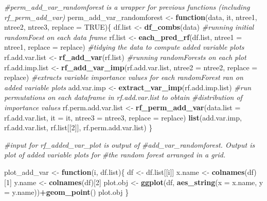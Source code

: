 \documentclass[12pt,twoside]{reedthesis}
\newenvironment{Shaded}{\begin{snugshade}}{\end{snugshade}}
\newcommand{\KeywordTok}[1]{\textcolor[rgb]{0.13,0.29,0.53}{\textbf{#1}}}
\newcommand{\DataTypeTok}[1]{\textcolor[rgb]{0.13,0.29,0.53}{#1}}
\newcommand{\DecValTok}[1]{\textcolor[rgb]{0.00,0.00,0.81}{#1}}
\newcommand{\StringTok}[1]{\textcolor[rgb]{0.31,0.60,0.02}{#1}}
\newcommand{\CommentTok}[1]{\textcolor[rgb]{0.56,0.35,0.01}{\textit{#1}}}
\newcommand{\OtherTok}[1]{\textcolor[rgb]{0.56,0.35,0.01}{#1}}
\newcommand{\ControlFlowTok}[1]{\textcolor[rgb]{0.13,0.29,0.53}{\textbf{#1}}}
\newcommand{\OperatorTok}[1]{\textcolor[rgb]{0.81,0.36,0.00}{\textbf{#1}}}
\newcommand{\NormalTok}[1]{#1}
\theoremstyle{definition}
\theoremstyle{definition}
\theoremstyle{definition}
\theoremstyle{remark}
\begin{document}
\begin{Shaded}
\begin{Highlighting}[]
{\CommentTok{#perm_add_var_randomforest is a wrapper for previous functions (including rf_perm_add_var)}
\NormalTok{perm_add_var_randomforest <-}\StringTok{ }\ControlFlowTok{function}\NormalTok{(data, it, ntree1, ntree2, ntree3, }\DataTypeTok{replace =} \OtherTok{TRUE}\NormalTok{)\{}
\NormalTok{  df.list <-}\StringTok{ }\KeywordTok{df_combs}\NormalTok{(data)}
  \CommentTok{#running initial randomFoest on each data frame}
\NormalTok{  rf.list <-}\StringTok{ }\KeywordTok{each_pred_rf}\NormalTok{(df.list, }\DataTypeTok{ntree1 =}\NormalTok{ ntree1, }\DataTypeTok{replace =}\NormalTok{ replace)}
  \CommentTok{#tidying the data to compute added variable plots}
\NormalTok{  rf.add.var.list <-}\StringTok{ }\KeywordTok{rf_add_var}\NormalTok{(rf.list)}
  \CommentTok{#running randomForests on each plot}
\NormalTok{  rf.add.imp.list <-}\StringTok{ }\KeywordTok{rf_add_var_imp}\NormalTok{(rf.add.var.list, }
                                    \DataTypeTok{ntree2 =}\NormalTok{ ntree2, }\DataTypeTok{replace =}\NormalTok{ replace)}
  \CommentTok{#extracts variable importance values for each randomForest ran on added variable plots}
\NormalTok{  add.var.imp <-}\StringTok{ }\KeywordTok{extract_var_imp}\NormalTok{(rf.add.imp.list)}
  \CommentTok{#run permutations on each dataframe in rf.add.var.list to obtain }
  \CommentTok{#distribution of importance values}
\NormalTok{  rf.perm.add.var.list <-}\StringTok{ }\KeywordTok{rf_perm_add_var}\NormalTok{(}\DataTypeTok{data.list =}\NormalTok{ rf.add.var.list, }
                                          \DataTypeTok{it =}\NormalTok{ it, }\DataTypeTok{ntree3 =}\NormalTok{ ntree3, }\DataTypeTok{replace =}\NormalTok{ replace)}
  \KeywordTok{list}\NormalTok{(add.var.imp, rf.add.var.list, rf.list[[}\DecValTok{2}\NormalTok{]], rf.perm.add.var.list)}
\NormalTok{\}}

\CommentTok{#input for rf_added_var_plot is output of }
\CommentTok{#add_var_randomforest. Output is plot of added variable plots for }
\CommentTok{#the random forest arranged in a grid.}

\NormalTok{plot_add_var <-}\StringTok{ }\ControlFlowTok{function}\NormalTok{(i, df.list)\{}
\NormalTok{  df <-}\StringTok{ }\NormalTok{df.list[[i]]}
\NormalTok{  x.name <-}\StringTok{ }\KeywordTok{colnames}\NormalTok{(df)[}\DecValTok{1}\NormalTok{]}
\NormalTok{  y.name <-}\StringTok{ }\KeywordTok{colnames}\NormalTok{(df)[}\DecValTok{2}\NormalTok{]}
\NormalTok{  plot.obj <-}\StringTok{ }\KeywordTok{ggplot}\NormalTok{(df, }\KeywordTok{aes_string}\NormalTok{(}\DataTypeTok{x =}\NormalTok{ x.name, }\DataTypeTok{y =}\NormalTok{ y.name))}\OperatorTok{+}\KeywordTok{geom_point}\NormalTok{()}
\NormalTok{  plot.obj}
\NormalTok{\}}

}
\end{Highlighting}
\end{Shaded}
\end{document}
